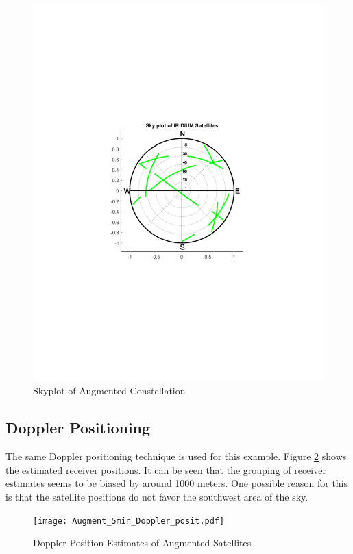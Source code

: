 \documentclass[12pt]{report}
\begin{document}
\begin{figure}[h!]
    \centering
    \includegraphics[trim=1.2in 3.3in 1.75in 3.7in,clip,width=5in]
    {Augment_Skyplot.pdf}
    \caption{Skyplot of Augmented Constellation}
    \label{fig:AugmentSky}
\end{figure}

\subsection{Doppler Positioning}
The same Doppler positioning technique is used for this example. Figure \ref{fig:Augmentdopplerposit} shows the estimated receiver positions. It can be seen that the grouping of receiver estimates seems to be biased by around 1000 meters. One possible reason for this is that the satellite positions do not favor the southwest area of the sky. 

\begin{figure}[h!]
    \centering
    \texttt{[image: Augment\_5min\_Doppler\_posit.pdf]}
    \caption{Doppler Position Estimates of Augmented Satellites}
    \label{fig:Augmentdopplerposit}
\end{figure}
\end{document}
